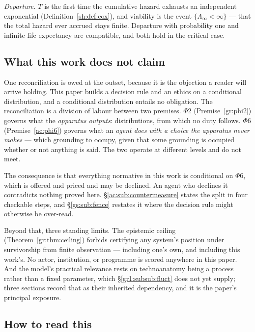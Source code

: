 \documentclass[11pt]{article}
\numberwithin{equation}{section}
\theoremstyle{plain}
\theoremstyle{definition}
\theoremstyle{remark}
\begin{document}
\emph{Departure.} $T$ is the first time the cumulative hazard exhausts an
independent exponential (Definition~\ref{sh:def:cox}), and viability is
the event $\{\Lambda_\infty<\infty\}$ --- that the total hazard ever
accrued stays finite. Departure with probability one and infinite life
expectancy are compatible, and both hold in the critical case.

\subsection{What this work does not claim}\label{intro:sub:notclaimed}

One reconciliation is owed at the outset, because it is the objection a
reader will arrive holding. This paper builds a decision rule and an
ethics on a conditional distribution, and a conditional distribution
entails no obligation. The reconciliation is a division of labour between
two premises. $\Phi2$ (Premise~\ref{gr:phi2}) governs what the
\emph{apparatus outputs}: distributions, from which no duty follows.
$\Phi6$ (Premise~\ref{ac:phi6}) governs what an \emph{agent does with a
choice the apparatus never makes} --- which grounding to occupy, given
that some grounding is occupied whether or not anything is said. The two
operate at different levels and do not meet.

The consequence is that everything normative in this work is conditional
on $\Phi6$, which is offered and priced and may be declined. An agent who
declines it contradicts nothing proved here.
\S\ref{ac:sub:countermeasure} states the split in four checkable steps,
and \S\ref{gs:sub:fence} restates it where the decision rule might
otherwise be over-read.

Beyond that, three standing limits. The epistemic ceiling
(Theorem~\ref{gr:thm:ceiling}) forbids certifying any system's position
under survivorship from finite observation --- including one's own, and
including this work's. No actor, institution, or programme is scored
anywhere in this paper. And the model's practical relevance rests on
technoanatomy being a process rather than a fixed parameter, which
\S\ref{gr1:subsub:fluct} does not yet supply; three sections record that
as their inherited dependency, and it is the paper's principal exposure.

\subsection{How to read this}\label{intro:sub:reading}
\end{document}
